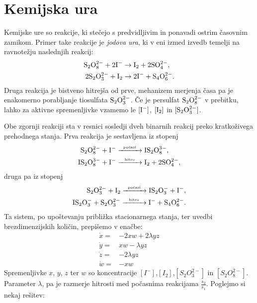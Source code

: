 \documentclass[slovene,11pt,a4paper]{article}
\newcommand\sul{{\rm S}}
\newcommand\oxi{{\rm O}}
\newcommand\jod{{\rm I}}
\numberwithin{equation}{section} %
\numberwithin{figure}{section} %
\numberwithin{table}{section} %
\begin{document}
\pagebreak
\section{Kemijska ura}
Kemijske ure so reakcije, ki stečejo s predvidljivim in
  ponavadi ostrim časovnim zamikom. Primer take reakcije je
  \emph{jodova ura}, ki v eni izmed izvedb temelji na ravnotežju
  naslednjih reakcij:
\begin{align*}
  \sul_2\oxi_8^{2-}+2\jod^- &\rightarrow \jod_2+2\sul\oxi_4^{2-},\\
  2\sul_2\oxi_3^{2-}+\jod_2 &\rightarrow2\jod^- + \sul_4 \oxi_6^{2-}.
\end{align*}
Druga reakcija je bistveno hitrejša od prve, mehanizem merjenja časa
pa je enakomerno porabljanje tiosulfata $\sul_2\oxi_3^{2-}$. Če je
persulfat $\sul_2\oxi_8^{2-}$ v prebitku, lahko za aktivne
spremenljivke vzamemo le $[\jod^-]$, $[\jod_2]$ in $[\sul_2
  \oxi_3^{2-}]$.%

Obe zgornji reakciji sta v resnici sosledji dveh binarnih reakcij preko
kratkoživega prehodnega stanja. Prva reakcija je sestavljena iz stopenj
\begin{align*}
  \sul_2\oxi_8^{2-}+\jod^-&\xrightarrow{\makebox[1cm][c]{\text{\tiny počasi}}} \jod\sul_2\oxi_8^{3-},\\
  \jod\sul_2\oxi_8^{3-}+\jod^-&\xrightarrow{\makebox[1cm][c]{\text{\tiny hitro}}} \jod_2+2\sul\oxi_4^{2-},
\end{align*}
druga pa iz stopenj
\begin{align*}
 \sul_2\oxi_3^{2-}+\jod_2\xrightarrow{\makebox[1cm][c]{\text{\tiny počasi}}}\jod\sul_2\oxi_3^{-}+\jod^-,\\
 \jod\sul_2\oxi_3^-+\sul_2\oxi_3^{2-}\xrightarrow{\makebox[1cm][c]{\text{\tiny hitro}}}\jod^-+\sul_4\oxi_6^{2-}.
\end{align*}
Ta sistem, po upoštevanju približka stacionarnega stanja, ter uvedbi brezdimenzijskih količin, prepišemo v enačbe:
\begin{equation}
\begin{aligned}
\dot{x}=& -2 x w + 2 \lambda y z \\
\dot{y}=& x w - \lambda y z \\
\dot{z}=& -2 \lambda y z \\
\dot{w}=& -x w
\end{aligned}
\end{equation}
Spremenljivke $x$, $y$, $z$ ter $w$ so koncentracije $[I^-]$,$[I_2]$,$[S_2 O_3^{2-}]$ in $[S_2 O_8^{2-}]$. Parameter $\lambda$, pa je razmerje hitrosti med počasnima reakcijama $\frac{s_2}{s_1}$.
Poglejmo si nekaj rešitev:
\end{document}
